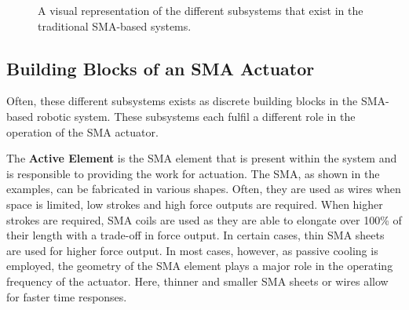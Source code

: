 \begin{figure}[hbt] %
  \centering
  \caption{A visual representation of the different subsystems that exist in the traditional SMA-based systems.}
  \label{fig:hexahon-base-layer}
\end{figure}

\subsection{Building Blocks of an SMA Actuator}
Often, these different subsystems exists as discrete building blocks in the SMA-based robotic system. These subsystems each fulfil a different role in the operation of the SMA actuator.

The \textbf{Active Element} is the SMA element that is present within the system and is responsible to providing the work for actuation. The SMA, as shown in the examples, can be fabricated in various shapes. Often, they are used as wires when space is limited, low strokes and high force outputs are required. When higher strokes are required, SMA coils are used as they are able to elongate over 100\% of their length with a trade-off in force output. In certain cases, thin SMA sheets are used for higher force output. In most cases, however, as passive cooling is employed, the geometry of the SMA element plays a major role in the operating frequency of the actuator. Here, thinner and smaller SMA sheets or wires allow for faster time responses.

